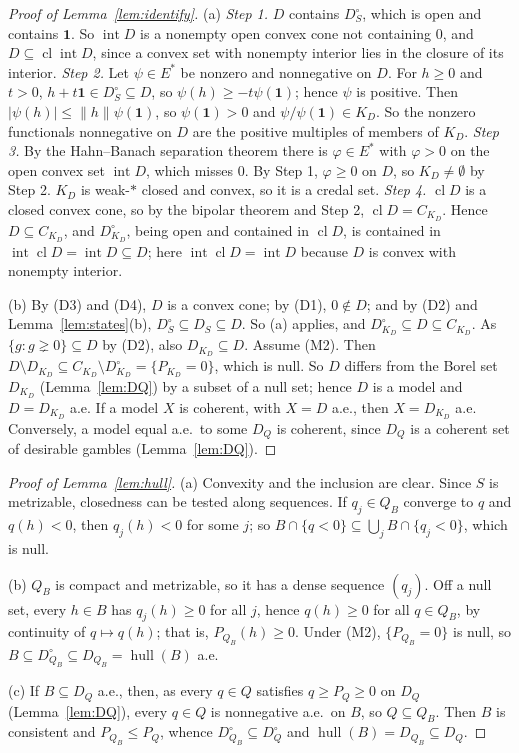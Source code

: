 \documentclass[11pt]{article}
\newcommand{\one}{\mathbf{1}}
\newcommand{\hull}{\operatorname{hull}}
\DeclareMathOperator{\cl}{cl}
\DeclareMathOperator{\inter}{int}
\theoremstyle{plain}
\theoremstyle{definition}
\begin{document}
\begin{proof}[Proof of Lemma~\ref{lem:identify}]
(a) \emph{Step 1.} $D$ contains $D_S^\circ$, which is open and contains $\one$. So $\inter D$ is a
nonempty open convex cone not containing $0$, and $D\subseteq\cl\inter D$, since a convex set
with nonempty interior lies in the closure of its interior.
\emph{Step 2.} Let $\psi\in E^\ast$ be nonzero and nonnegative on $D$. For $h\ge0$ and $t>0$,
$h+t\one\in D_S^\circ\subseteq D$, so $\psi(h)\ge-t\psi(\one)$; hence $\psi$ is positive. Then
$|\psi(h)|\le\|h\|\psi(\one)$, so $\psi(\one)>0$ and $\psi/\psi(\one)\in K_D$. So the nonzero
functionals nonnegative on $D$ are the positive multiples of members of $K_D$.
\emph{Step 3.} By the Hahn--Banach separation theorem there is $\varphi\in E^\ast$ with
$\varphi>0$ on the open convex set $\inter D$, which misses $0$. By Step 1, $\varphi\ge0$ on $D$,
so $K_D\ne\emptyset$ by Step 2. $K_D$ is weak-$\ast$ closed and convex, so it is a credal set.
\emph{Step 4.} $\cl D$ is a closed convex cone, so by the bipolar theorem and Step 2, $\cl D=
C_{K_D}$. Hence $D\subseteq C_{K_D}$, and $D^\circ_{K_D}$, being open and contained in $\cl D$,
is contained in $\inter\cl D=\inter D\subseteq D$; here $\inter\cl D=\inter D$ because $D$ is
convex with nonempty interior.

(b) By (D3) and (D4), $D$ is a convex cone; by (D1), $0\notin D$; and by (D2) and
Lemma~\ref{lem:states}(b), $D_S^\circ\subseteq D_S\subseteq D$. So (a) applies, and
$D^\circ_{K_D}\subseteq D\subseteq C_{K_D}$. As $\{g:g\gneq0\}\subseteq D$ by (D2), also
$D_{K_D}\subseteq D$. Assume (M2). Then $D\setminus D_{K_D}\subseteq C_{K_D}\setminus
D^\circ_{K_D}=\{P_{K_D}=0\}$, which is null. So $D$ differs from the Borel set $D_{K_D}$
(Lemma~\ref{lem:DQ}) by a subset of a null set; hence $D$ is a model and $D=D_{K_D}$ a.e. If a
model $X$ is coherent, with $X=D$ a.e., then $X=D_{K_D}$ a.e. Conversely, a model equal a.e.\ to
some $D_Q$ is coherent, since $D_Q$ is a coherent set of desirable gambles (Lemma~\ref{lem:DQ}).
\end{proof}

\begin{proof}[Proof of Lemma~\ref{lem:hull}]
(a) Convexity and the inclusion are clear. Since $S$ is metrizable, closedness can be tested
along sequences. If $q_j\in Q_B$ converge to $q$ and $q(h)<0$, then $q_j(h)<0$ for some $j$; so
$B\cap\{q<0\}\subseteq\bigcup_jB\cap\{q_j<0\}$, which is null.

(b) $Q_B$ is compact and metrizable, so it has a dense sequence $(q_j)$. Off a null set, every
$h\in B$ has $q_j(h)\ge0$ for all $j$, hence $q(h)\ge0$ for all $q\in Q_B$, by continuity of
$q\mapsto q(h)$; that is, $P_{Q_B}(h)\ge0$. Under (M2), $\{P_{Q_B}=0\}$ is null, so
$B\subseteq D^\circ_{Q_B}\subseteq D_{Q_B}=\hull(B)$ a.e.

(c) If $B\subseteq D_Q$ a.e., then, as every $q\in Q$ satisfies $q\ge P_Q\ge0$ on $D_Q$
(Lemma~\ref{lem:DQ}), every $q\in Q$ is nonnegative a.e.\ on $B$, so $Q\subseteq Q_B$. Then $B$
is consistent and $P_{Q_B}\le P_Q$, whence $D^\circ_{Q_B}\subseteq D^\circ_Q$ and $\hull(B)=
D_{Q_B}\subseteq D_Q$.
\end{proof}
\end{document}
